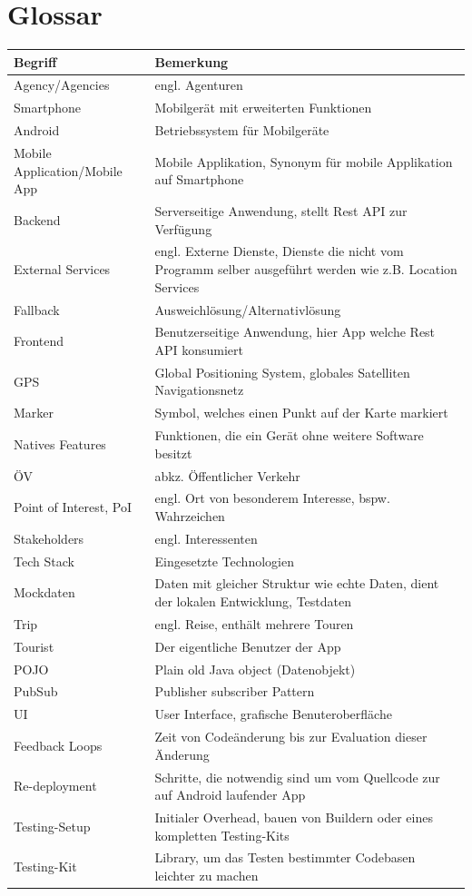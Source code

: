 \documentclass[a4paper,10pt,xetex]{article}
\begin{document}
\section{Glossar}\label{glossar}
\begin{longtabu} to \textwidth { | l | X[l] | }
\hline
\textbf{Begriff} & \textbf{Bemerkung}\\\hline
\endhead

Agency/Agencies & engl. Agenturen\\\hline
Smartphone & Mobilgerät mit erweiterten Funktionen\\\hline
Android & Betriebssystem für Mobilgeräte\\\hline
Mobile Application/Mobile App & Mobile Applikation, Synonym für mobile Applikation auf Smartphone\\\hline
Backend & Serverseitige Anwendung, stellt Rest API zur Verfügung\\\hline
External Services & engl. Externe Dienste, Dienste die nicht vom Programm selber ausgeführt werden wie z.B. Location Services\\\hline
Fallback & Ausweichlösung/Alternativlösung\\\hline
Frontend & Benutzerseitige Anwendung, hier App welche Rest API konsumiert\\\hline
GPS & Global Positioning System, globales Satelliten Navigationsnetz\\\hline
Marker & Symbol, welches einen Punkt auf der Karte markiert\\\hline
Natives Features & Funktionen, die ein Gerät ohne weitere Software besitzt\\\hline
ÖV & abkz. Öffentlicher Verkehr\\\hline
Point of Interest, PoI & engl. Ort von besonderem Interesse, bspw. Wahrzeichen\\\hline
Stakeholders & engl. Interessenten\\\hline
Tech Stack & Eingesetzte Technologien\\\hline
Mockdaten & Daten mit gleicher Struktur wie echte Daten, dient der lokalen Entwicklung, Testdaten \\\hline
Trip & engl. Reise, enthält mehrere Touren\\\hline
Tourist & Der eigentliche Benutzer der App\\\hline
POJO & Plain old Java object (Datenobjekt)\\\hline
PubSub & Publisher subscriber Pattern\\\hline
UI & User Interface, grafische Benuteroberfläche \\\hline
Feedback Loops & Zeit von Codeänderung bis zur Evaluation dieser Änderung \\\hline
Re-deployment & Schritte, die notwendig sind um vom Quellcode zur auf Android laufender App \\\hline
Testing-Setup & Initialer Overhead, bauen von Buildern oder eines kompletten Testing-Kits \\\hline
Testing-Kit & Library, um das Testen bestimmter Codebasen leichter zu machen \\\hline
\end{longtabu}
\end{document}
